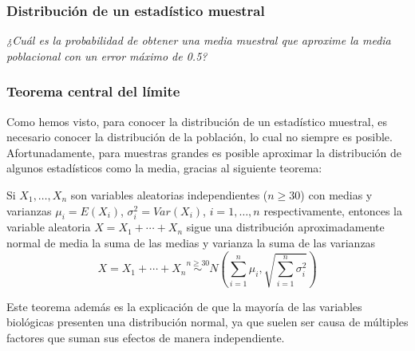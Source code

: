 \begin{frame}
\frametitle{Distribución de un estadístico muestral}
\begin{center}
\resizebox{0.49\textwidth}{!}{}
\resizebox{0.49\textwidth}{!}{}

\emph{¿Cuál es la probabilidad de obtener una media muestral que aproxime la media poblacional con un error máximo de 0.5?}
\end{center}
\end{frame}


\begin{frame}
\frametitle{Teorema central del límite}
Como hemos visto, para conocer la distribución de un estadístico muestral, es necesario conocer la distribución de la población, lo cual no siempre es posible. 
Afortunadamente, para muestras grandes es posible aproximar la distribución de algunos estadísticos como la media, gracias al siguiente teorema:

\begin{teorema}
Si $X_1,\ldots, X_n$ son variables aleatorias independientes  ($n\geq 30$) con medias y varianzas $\mu_i=E(X_i)$, $\sigma^2_i=Var(X_i)$, $i=1,\ldots,n$ respectivamente, entonces la variable aleatoria $X=X_1+\cdots+X_n$ sigue una distribución aproximadamente normal de media la suma de las medias y varianza la suma de las varianzas
\[
X=X_1+\cdots+X_n\stackrel{n\geq 30} \sim N\left(\sum_{i=1}^n \mu_i, \sqrt{\sum_{i=1}^n \sigma^2_i}\right)
\]
\end{teorema}

Este teorema además es la explicación de que la mayoría de las variables biológicas presenten una distribución normal, ya que suelen ser causa de múltiples factores que suman sus efectos de manera independiente.
\end{frame}



